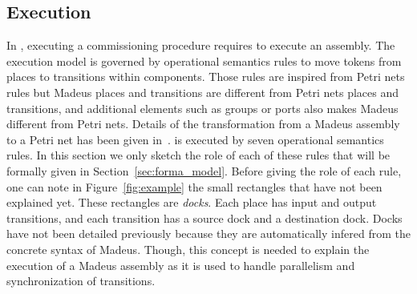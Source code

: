 \subsection{Execution}

In \mad, executing a commissioning procedure requires to execute an
assembly. 
The \mad execution model is governed by operational semantics rules to
move tokens from places to transitions within components. Those rules
are inspired from Petri nets rules but Madeus places and transitions
are different from Petri nets places and transitions, and additional
elements such as groups or ports also makes Madeus different from
Petri nets. Details of the transformation from a Madeus assembly to a
Petri net has been given in~\cite{}. \mad is executed by seven
operational semantics rules. In this section we only sketch the role
of each of these rules that will be formally given in
Section~\ref{sec:forma_model}. Before giving the role of each rule,
one can note in Figure~\ref{fig:example} the small rectangles that
have not been explained yet. These rectangles are \emph{docks}. Each
place has input and output transitions, and each transition has a
source dock and a destination dock. Docks have not been detailed
previously because they are automatically infered from the concrete
syntax of Madeus. Though, this concept is needed to explain the
execution of a Madeus assembly as it is used to handle parallelism and
synchronization of transitions.
%
